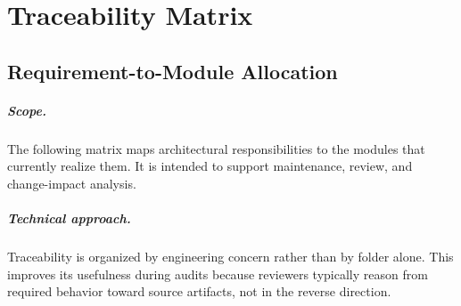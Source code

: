 \documentclass[11pt,a4paper]{report}
\newcommand{\approach}[1]{\paragraph{Technical approach.} #1}
\newcommand{\scopep}[1]{\paragraph{Scope.} #1}
\begin{document}
\chapter{Traceability Matrix}

\section{Requirement-to-Module Allocation}
\scopep{The following matrix maps architectural responsibilities to the modules that currently realize
them. It is intended to support maintenance, review, and change-impact analysis.}

\approach{Traceability is organized by engineering concern rather than by folder alone. This improves
its usefulness during audits because reviewers typically reason from required behavior toward source
artifacts, not in the reverse direction.}
\end{document}
